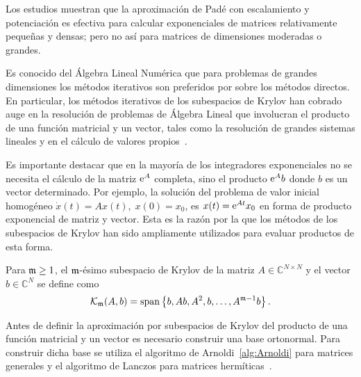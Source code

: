 Los estudios muestran que la aproximación de Padé con escalamiento y potenciación
es efectiva para calcular exponenciales de matrices relativamente peque\~nas y densas; pero no as\'i para matrices de dimensiones moderadas o grandes.

Es conocido del \'Algebra Lineal Numérica que para problemas de
grandes dimensiones los métodos iterativos son preferidos por sobre los métodos directos.
En particular,
los métodos iterativos de los subespacios de Krylov han cobrado auge en la resolución de
problemas de \'Algebra Lineal que involucran el producto de una función matricial y un vector,
tales como la resolución de grandes sistemas lineales y en el c\'alculo de valores
propios~\cite{golub2013matrix}.

Es importante destacar que en la mayor\'ia de los integradores exponenciales
 no se necesita el c\'alculo de la matriz $\mathrm{e}^{A}$ completa, sino
el producto $\mathrm{e}^{A}b$ donde $b$ es un vector determinado. Por ejemplo, la solución del problema de valor inicial homogéneo $\dot{x}(t)=Ax(t),\;x(0)=x_0$, es $x(t)=\mathrm{e}^{At}x_0$ en forma de producto exponencial de matriz y vector. Esta es la razón por la que
los métodos de los subespacios de Krylov han sido ampliamente utilizados para evaluar productos de esta forma.

\begin{definition}
        \cite{Saad92} Para $\mathfrak{m}\geq 1$, el $\mathfrak{m}$-ésimo subespacio de Krylov de la matriz $A\in\mathbb{C}^{N\times N}$
    y el vector $b\in\mathbb{C}^{N}$ se define como
    \[ \mathcal{K}_{\mathfrak{m}}(A,b)=\mathrm{span}\left\{ b,Ab,A^{2},b,\ldots,A^{\mathfrak{m}-1}b \right\}. \]
\end{definition}

Antes de definir la aproximación por subespacios de Krylov del producto de una función matricial y un vector es
necesario construir una base ortonormal. Para construir dicha base se utiliza el algoritmo de
Arnoldi~\ref{alg:Arnoldi} para matrices generales y el algoritmo de 
Lanczos para matrices hermíticas~\cite{arnoldi,saad2003iterative}.

